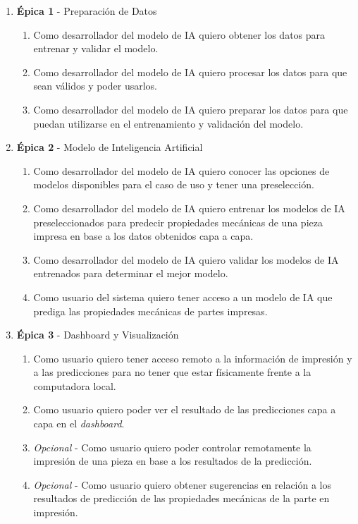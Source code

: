 \documentclass[
11pt, %
]{charter}
\begin{document}
\begin{enumerate}
  \item \textbf{\'{E}pica 1} - Preparación de Datos
    \begin{enumerate}
      \item Como desarrollador del modelo de IA quiero obtener los datos para entrenar y validar el modelo.
      \item Como desarrollador del modelo de IA quiero procesar los datos para que sean válidos y poder usarlos.
      \item Como desarrollador del modelo de IA quiero preparar los datos para que puedan utilizarse en el entrenamiento y validación del modelo.
    \end{enumerate}
  \item \textbf{\'{E}pica 2} - Modelo de Inteligencia Artificial
    \begin{enumerate}
      \item Como desarrollador del modelo de IA quiero conocer las opciones de modelos disponibles para el caso de uso y tener una preselección.
      \item Como desarrollador del modelo de IA quiero entrenar los modelos de IA preseleccionados para predecir propiedades mecánicas de una pieza impresa en base a los datos obtenidos capa a capa.
      \item Como desarrollador del modelo de IA quiero validar los modelos de IA entrenados para determinar el mejor modelo.
      \item Como usuario del sistema quiero tener acceso a un modelo de IA que prediga las propiedades mecánicas de partes impresas.
    \end{enumerate}
  \item \textbf{\'{E}pica 3} - Dashboard y Visualización
    \begin{enumerate}
      \item Como usuario quiero tener acceso remoto a la información de impresión y a las predicciones para no tener que estar físicamente frente a la computadora local.
      \item Como usuario quiero poder ver el resultado de las predicciones capa a capa en el \textit{dashboard}.
      \item \textit{Opcional} - Como usuario quiero poder controlar remotamente la impresión de una pieza en base a los resultados de la predicción.
      \item \textit{Opcional} - Como usuario quiero obtener sugerencias en relación a los resultados de predicción de las propiedades mecánicas de la parte en impresión.

\end{enumerate}
\end{enumerate}
\end{document}
